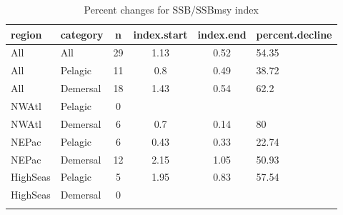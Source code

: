 \begin{longtable}{p{4cm}p{3.5cm}cccp{5.5cm}}
  \hline
region & category & n & index.start & index.end & percent.decline \\ 
  \hline
All & All & 29 & 1.13 & 0.52 & 54.35 \\ 
  All & Pelagic & 11 & 0.8 & 0.49 & 38.72 \\ 
  All & Demersal & 18 & 1.43 & 0.54 & 62.2 \\ 
  NWAtl & Pelagic & 0 &  &  &  \\ 
  NWAtl & Demersal & 6 & 0.7 & 0.14 & 80 \\ 
  NEPac & Pelagic & 6 & 0.43 & 0.33 & 22.74 \\ 
  NEPac & Demersal & 12 & 2.15 & 1.05 & 50.93 \\ 
  HighSeas & Pelagic & 5 & 1.95 & 0.83 & 57.54 \\ 
  HighSeas & Demersal & 0 &  &  &  \\ 
   \hline
\hline
\caption{Percent changes for SSB/SSBmsy index}
\label{tab:brp:perc}
\end{longtable}
